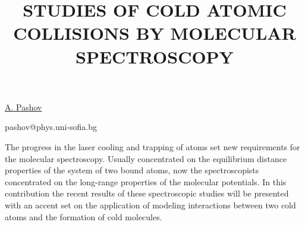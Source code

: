 \title{STUDIES OF COLD ATOMIC COLLISIONS BY MOLECULAR SPECTROSCOPY}

\underline{A. Pashov} 

{\normalsize{\vspace{-4mm}
\unisofia

\email pashov@phys.uni-sofia.bg}}

The progress in the laser cooling and trapping of atoms set new requirements for the molecular spectroscopy. Usually concentrated on the equilibrium distance properties of the system of two bound atoms, now the spectroscopists concentrated on the long-range properties of the molecular potentials. In this contribution the recent results of these spectroscopic studies will be presented with an accent set on the application of modeling interactions between two cold atoms and the formation of cold molecules.

\vspace{\baselineskip} 
